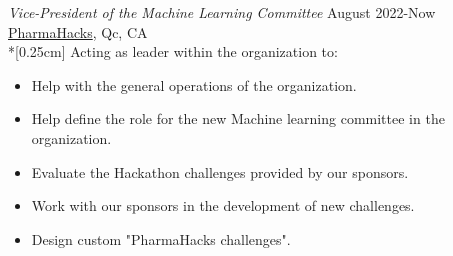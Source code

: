 \documentclass[margin, 10pt]{res} %
\begin{document}
\begin{resume}
		{\sl Vice-President of the Machine Learning Committee} \hfill August 2022-Now\\ \href{https://pharmahacks.com/}{PharmaHacks}, Qc, CA\\*[0.25cm] 
		Acting as leader within the organization to:
		\vspace*{0.15cm}
		\begin{itemize}\itemsep -2pt %
			\item Help with the general operations of the organization.
			\item Help define the role for the new Machine learning committee in the organization.
			\item Evaluate the Hackathon challenges provided by our sponsors.
			\item Work with our sponsors in the development of new challenges.
			\item Design custom "PharmaHacks challenges".  
		\end{itemize}
		
		

\end{resume}
\end{document}

